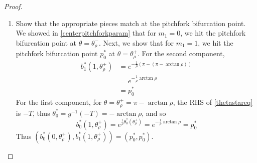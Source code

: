 \documentclass[thesis.tex]{subfiles}
\begin{document}
\begin{lemma}
\begin{proof}
\begin{enumerate}
\begin{enumerate}
	\item Show that the appropriate pieces match at the pitchfork bifurcation point. We showed in \eqref{centerpitchforkparam} that for $m_1 = 0$, we hit the pitchfork bifurcation point at $\theta = \theta_\rho^-$. Next, we show that for $m_1 = 1$, we hit the pitchfork bifurcation point $p_0^*$ at $\theta = \theta_\rho^+$. 
	For the second component, 
	\begin{align*}
	b_1^*(1, \theta_\rho^+) &= e^{-\frac{1}{\rho}(\pi - (\pi - \arctan \rho)) } \\
	&= e^{ -\frac{1}{\rho} \arctan \rho } \\
	&= p_0^*
	\end{align*}
	For the first component, for $\theta = \theta_\rho^+ = \pi -\arctan \rho$, the RHS of \eqref{thetastareq} is $-T$, thus $\theta_0^* = g^{-1}(-T) = -\arctan \rho$, and so 
	\[
	b_0^*(1, \theta_\rho^+) = e^{ \frac{1}{\rho} \theta_0^*(\theta_\rho^+)} = e^{ -\frac{1}{\rho} \arctan \rho } = p_0^*
	\]
	Thus $(b_0^*(0, \theta_\rho^+), b_1^*(1, \theta_\rho^+)) = (p_0^*,p_0^*).$
\end{enumerate}


\end{enumerate}
\end{proof}
\end{lemma}
\end{document}
